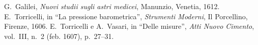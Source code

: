 \documentclass[11pt,twoside,oldstyle,autoretitolo,classica,greek,evenboxes]{toptesi}
\begin{document}
\fi

\mainmatter


\begin{thebibliography}{9}
 G.~Galilei, {\em Nuovi studii sugli astri medicei}, Manunzio,
        Venetia, 1612.
 E.~Torricelli, in ``La pressione barometrica'', {\em Strumenti
        Moderni}, Il Porcellino, Firenze, 1606.
 E.~Torricelli e A.~Vasari, in ``Delle misure'', {\em Atti Nuovo
        Cimento}, vol.~III, n.~2 (feb. 1607), p.~27--31.
\end{thebibliography}
\end{document}
